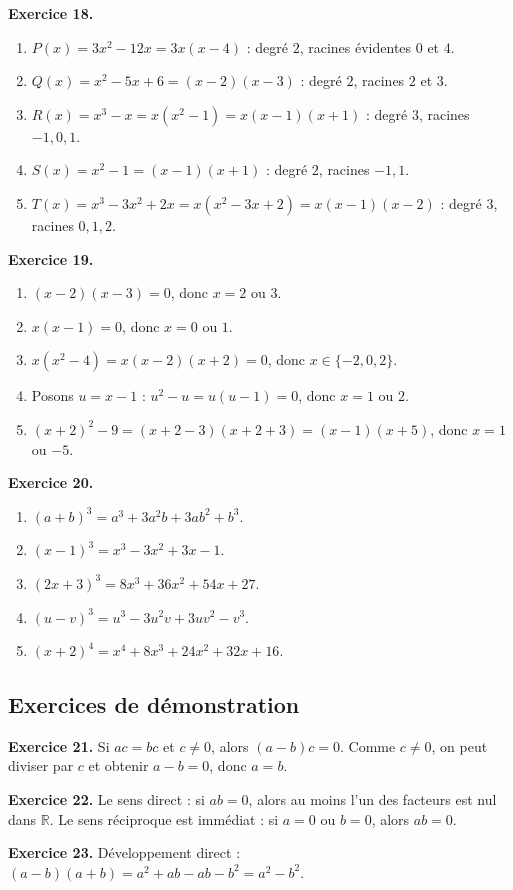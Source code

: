 \documentclass[11pt,a4paper]{article}
\newcommand{\R}{\mathbb R}
\begin{document}
\textbf{Exercice 18.}
\begin{enumerate}[label=\alph*)]
\item $P(x)=3x^2-12x=3x(x-4)$ : degré $2$, racines évidentes $0$ et $4$.
\item $Q(x)=x^2-5x+6=(x-2)(x-3)$ : degré $2$, racines $2$ et $3$.
\item $R(x)=x^3-x=x(x^2-1)=x(x-1)(x+1)$ : degré $3$, racines $-1,0,1$.
\item $S(x)=x^2-1=(x-1)(x+1)$ : degré $2$, racines $-1,1$.
\item $T(x)=x^3-3x^2+2x=x(x^2-3x+2)=x(x-1)(x-2)$ : degré $3$, racines $0,1,2$.
\end{enumerate}

\textbf{Exercice 19.}
\begin{enumerate}[label=\alph*)]
\item $(x-2)(x-3)=0$, donc $x=2$ ou $3$.
\item $x(x-1)=0$, donc $x=0$ ou $1$.
\item $x(x^2-4)=x(x-2)(x+2)=0$, donc $x\in\{-2,0,2\}$.
\item Posons $u=x-1$ : $u^2-u=u(u-1)=0$, donc $x=1$ ou $2$.
\item $(x+2)^2-9=(x+2-3)(x+2+3)=(x-1)(x+5)$, donc $x=1$ ou $-5$.
\end{enumerate}

\textbf{Exercice 20.}
\begin{enumerate}[label=\alph*)]
\item $(a+b)^3=a^3+3a^2b+3ab^2+b^3$.
\item $(x-1)^3=x^3-3x^2+3x-1$.
\item $(2x+3)^3=8x^3+36x^2+54x+27$.
\item $(u-v)^3=u^3-3u^2v+3uv^2-v^3$.
\item $(x+2)^4=x^4+8x^3+24x^2+32x+16$.
\end{enumerate}

\subsection*{Exercices de démonstration}
\textbf{Exercice 21.} Si $ac=bc$ et $c\neq 0$, alors $(a-b)c=0$. Comme $c\neq 0$, on peut diviser par $c$ et obtenir $a-b=0$, donc $a=b$.

\textbf{Exercice 22.} Le sens direct : si $ab=0$, alors au moins l'un des facteurs est nul dans $\R$. Le sens réciproque est immédiat : si $a=0$ ou $b=0$, alors $ab=0$.

\textbf{Exercice 23.} Développement direct : $(a-b)(a+b)=a^2+ab-ab-b^2=a^2-b^2$.
\end{document}
